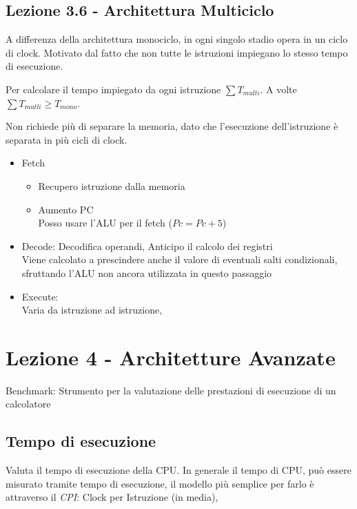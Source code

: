 \documentclass[a4paper,10pt]{article}
\begin{document}
\subsection{Lezione 3.6 - Architettura Multiciclo}
A differenza della architettura monociclo, in ogni singolo stadio opera in un ciclo di clock.
Motivato dal fatto che non tutte le istruzioni impiegano lo stesso tempo di esecuzione.

Per calcolare il tempo impiegato da ogni istruzione $\sum{T_{multi}}$.
A volte $\sum{T_{mutli}} \ge T_{mono}$.

Non richiede più di separare la memoria, dato che l'esecuzione dell'istruzione è separata in più cicli di clock.

\begin{itemize}
    \item Fetch
        \begin{itemize}
            \item Recupero istruzione dalla memoria
            \item Aumento PC
                \\
                Posso usare l'ALU per il fetch ($Pc = Pc + 5$)
        \end{itemize}
    \item Decode:
        Decodifica operandi, Anticipo il calcolo dei registri
        \\
        Viene calcolato a prescindere anche il valore di eventuali salti condizionali,
        sfruttando l'ALU non ancora utilizzata in questo passaggio

    \item Execute:
        \\
        Varia da istruzione ad istruzione,
\end{itemize}

\section{Lezione 4 - Architetture Avanzate}
Benchmark: Strumento per la valutazione delle prestazioni di esecuzione di un calcolatore

\subsection{Tempo di esecuzione}
Valuta il tempo di esecuzione della CPU.
In generale il tempo di CPU, può essere misurato tramite tempo di esecuzione, il modello più semplice per farlo è attraverso il
\textit{CPI}: Clock per Istruzione (in media),
\end{document}
